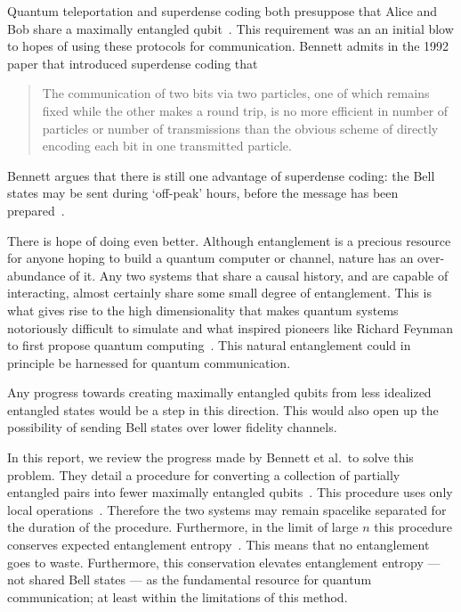 Quantum teleportation and superdense coding both presuppose that Alice and Bob share a maximally entangled qubit~\cite{barrett2004teleportation, bennett1992superdense}. 
This requirement was an an initial blow to hopes of using these protocols for communication.
Bennett admits in the 1992 paper that introduced superdense coding that

\hyphenblockcquote{UKenglish}{bennett1992superdense}{
The communication of two bits via two particles, one of which remains fixed while the other makes a round trip, is no more efficient in number of particles or number of transmissions than the obvious scheme of directly encoding each bit in one transmitted particle.
}

Bennett argues that there is still one advantage of superdense coding: the Bell states may be sent during `off-peak' hours, before the message has been prepared~\cite{bennett1992superdense}.

There is hope of doing even better.
Although entanglement is a precious resource for anyone hoping to build a quantum computer or channel, nature has an over-abundance of it. 
Any two systems that share a causal history, and are capable of interacting, almost certainly share some small degree of entanglement.
This is what gives rise to the high dimensionality that makes quantum systems notoriously difficult to simulate and what inspired pioneers like Richard Feynman to first propose quantum computing~\cite{feynman1982simulating}.
This natural entanglement could in principle be harnessed for quantum communication.

Any progress towards creating maximally entangled qubits from less idealized entangled states would be a step in this direction.
This would also open up the possibility of sending Bell states over lower fidelity channels.

In this report, we review the progress made by Bennett et al.\ to solve this problem.
They detail a procedure for converting a collection of partially entangled pairs into fewer maximally entangled qubits~\cite{bennett1996concentrating}.
This procedure uses only local operations~\cite{bennett1996concentrating}.
Therefore the two systems may remain spacelike separated for the duration of the procedure.
Furthermore, in the limit of large $n$ this procedure conserves expected entanglement entropy~\cite{bennett1996concentrating}.
This means that no entanglement goes to waste.
Furthermore, this conservation elevates entanglement entropy --- not shared Bell states --- as the fundamental resource for quantum communication; at least within the limitations of this method.

